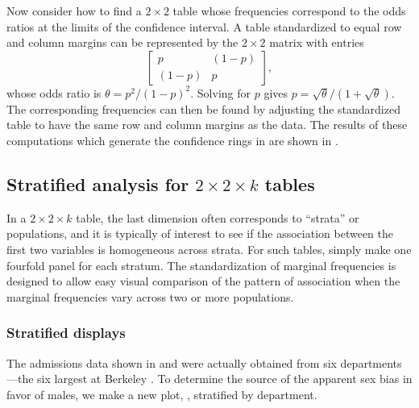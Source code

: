 \documentclass[10pt,krantz2]{krantz}\usepackage[]{graphicx}\usepackage[]{color}
\begin{document}
Now consider how to find a \(2 \times  2\) table whose frequencies
correspond to the odds ratios at the limits of the confidence
interval.  A table standardized to equal row and column margins can
be represented by the \(2 \times  2\) matrix with entries
\begin{equation*}
 \left[
  \begin{array}{cc}
   p & (1-p) \\
  (1-p) & p
  \end{array}
 \right]
 \comma
\end{equation*}
whose odds ratio is \(\theta  =  p^2 /  ( 1  -  p)^2\).
Solving for $p$ gives \(p  =  \sqrt \theta /  ( 1  +  \sqrt \theta )\).  The
corresponding frequencies can then be found by adjusting the
standardized table to have the same row and column margins as the
data. The results of these computations which generate the confidence
rings in  are shown in .





\subsection{Stratified analysis for $2 \times 2 \times k$ tables}\label{sec:twoway-fourstrat}
In a \(2 \times  2 \times  k\)
table, the last dimension often corresponds to ``strata'' or
populations, and it is typically of interest to see if the
association between the first two variables is homogeneous across
strata.  For such tables, simply make one fourfold panel for each
stratum.  The standardization of marginal frequencies is designed to
allow easy visual comparison of the pattern of association
when the marginal frequencies vary across two
or more populations.

\subsubsection{Stratified displays}\label{sec:twoway-strat}

The admissions data shown in
 and  were actually obtained
from six departments---the six largest at Berkeley
\citep{Bickel-etal:75}.
To determine the source of the apparent sex
bias in favor of males, we make a new plot, ,
stratified by department.
\end{document}
